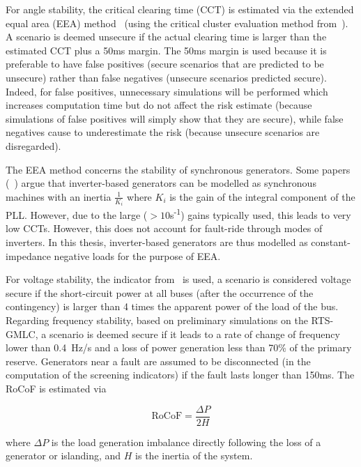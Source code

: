 For angle stability, the critical clearing time (CCT) is estimated via the extended equal area (EEA) method~\cite{EqualAreaCriterionEnergies} (using the critical cluster evaluation method from~\cite{EqualAreaCriterionPSCC}). A scenario is deemed unsecure if the actual clearing time is larger than the estimated CCT plus a 50ms margin. The 50ms margin is used because it is preferable to have false positives (\ie secure scenarios that are predicted to be unsecure) rather than false negatives (\ie unsecure scenarios predicted secure). Indeed, for false positives, unnecessary simulations will be performed which increases computation time but do not affect the risk estimate (because simulations of false positives will simply show that they are secure), while false negatives cause to underestimate the risk (because unsecure scenarios are disregarded).

The EEA method concerns the stability of synchronous generators. Some papers (\eg~\cite{ScreeningPLL}) argue that inverter-based generators can be modelled as synchronous machines with an inertia \(\frac{1}{K_i}\) where \(K_i\) is the gain of the integral component of the PLL. However, due to the large (\(>10\)s\textsuperscript{-1}) gains typically used, this leads to very low CCTs. However, this does not account for fault-ride through modes of inverters. In this thesis, inverter-based generators are thus modelled as constant-impedance negative loads for the purpose of EEA.

For voltage stability, the indicator from~\cite{VoltageScreeningMachowski} is used, \ie a scenario is considered voltage secure if the short-circuit power at all buses (after the occurrence of the contingency) is larger than 4 times the apparent power of the load of the bus. Regarding frequency stability, based on preliminary simulations on the RTS-GMLC, a scenario is deemed secure if it leads to a rate of change of frequency lower than 0.4~Hz/s and a loss of power generation less than 70\% of the primary reserve. Generators near a fault are assumed to be disconnected (in the computation of the screening indicators) if the fault lasts longer than 150ms. The RoCoF is estimated via

\begin{equation}
\text{RoCoF} = \frac{\Delta P}{2 H}
\end{equation}

\noindent where \(\Delta P\) is the load generation imbalance directly following the loss of a generator or islanding, and \(H\) is the inertia of the system.


